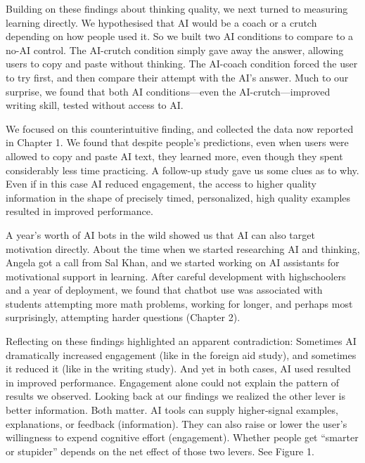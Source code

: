 \documentclass[11pt]{report}
\begin{document}
\begin{mainf}
Building on these findings about thinking quality, we next turned to measuring learning directly.
We hypothesised that AI would be a coach or a crutch depending on how people used it. 
So we built two AI conditions to compare to a no-AI control. 
The AI-crutch condition simply gave away the answer, allowing users to copy and paste without thinking. 
The AI-coach condition forced the user to try first, and then compare their attempt with the AI's answer. 
Much to our surprise, we found that both AI conditions—even the AI-crutch—improved writing skill, tested without access to AI. 

We focused on this counterintuitive finding, and collected the data now reported in Chapter 1. 
We found that despite people's predictions, even when users were allowed to copy and paste AI text, they learned more, even though they spent considerably less time practicing. 
A follow-up study gave us some clues as to why. 
Even if in this case AI reduced engagement, the access to higher quality information in the shape of precisely timed, personalized, high quality examples resulted in improved performance.

A year’s worth of AI bots in the wild showed us that AI can also target motivation directly. 
About the time when we started researching AI and thinking, Angela got a call from Sal Khan, and we started working on AI assistants for motivational support in learning. 
After careful development with highschoolers and a year of deployment, we found that chatbot use was associated with students attempting more math problems, working for longer, and perhaps most surprisingly, attempting harder questions (Chapter 2).

Reflecting on these findings highlighted an apparent contradiction: 
Sometimes AI dramatically increased engagement (like in the foreign aid study), and sometimes it reduced it (like in the writing study). 
And yet in both cases, AI used resulted in improved performance. 
Engagement alone could not explain the pattern of results we observed. 
Looking back at our findings we realized the other lever is better information. 
Both matter. AI tools can supply higher‑signal examples, explanations, or feedback (information). 
They can also raise or lower the user’s willingness to expend cognitive effort (engagement). 
Whether people get “smarter or stupider” depends on the net effect of those two levers. See Figure 1.


\usetikzlibrary{positioning}

\begin{figure}[h]
    \centering
\end{figure}
\end{mainf}
\end{document}
